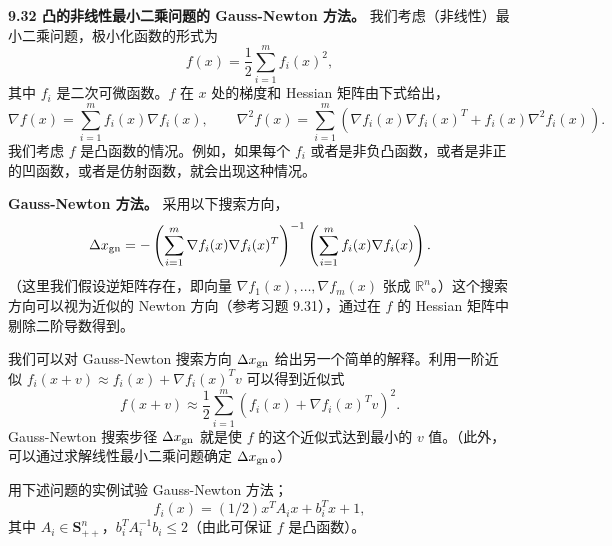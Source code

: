 \documentclass[UTF8, 12pt, fontset=fandol, oneside]{ctexart}
\begin{document}
\noindent\textbf{9.32 凸的非线性最小二乘问题的 Gauss-Newton 方法。}\quad
我们考虑（非线性）最小二乘问题，极小化函数的形式为
\[
f(x)=\frac{1}{2}\sum_{i=1}^m f_i(x)^2,
\]
其中 $f_i$ 是二次可微函数。$f$ 在 $x$ 处的梯度和 Hessian 矩阵由下式给出，
\[
\nabla f(x)=\sum_{i=1}^m f_i(x)\nabla f_i(x),\qquad
\nabla^2 f(x)=\sum_{i=1}^m(\nabla f_i(x)\nabla f_i(x)^T+f_i(x)\nabla^2 f_i(x)).
\]
我们考虑 $f$ 是凸函数的情况。例如，如果每个 $f_i$ 或者是非负凸函数，或者是非正的凹函数，或者是仿射函数，就会出现这种情况。

\noindent\textbf{Gauss-Newton 方法。}\quad
采用以下搜索方向，
\[
\Delta x_{\rm gn}=-\left(\sum_{i=1}^m\nabla f_i(x)\nabla f_i(x)^T\right)^{-1}
\left(\sum_{i=1}^m f_i(x)\nabla f_i(x)\right).
\]
（这里我们假设逆矩阵存在，即向量 $\nabla f_1(x),\ldots,\nabla f_m(x)$ 张成 $\mathbb{R}^n$。）这个搜索方向可以视为近似的 Newton 方向（参考习题 9.31），通过在 $f$ 的 Hessian 矩阵中剔除二阶导数得到。

我们可以对 Gauss-Newton 搜索方向 $\Delta x_{\rm gn}$ 给出另一个简单的解释。利用一阶近似 $f_i(x+v)\approx f_i(x)+\nabla f_i(x)^Tv$ 可以得到近似式
\[
f(x+v)\approx\frac{1}{2}\sum_{i=1}^m(f_i(x)+\nabla f_i(x)^Tv)^2.
\]
Gauss-Newton 搜索步径 $\Delta x_{\rm gn}$ 就是使 $f$ 的这个近似式达到最小的 $v$ 值。（此外，可以通过求解线性最小二乘问题确定 $\Delta x_{\rm gn}$。）

用下述问题的实例试验 Gauss-Newton 方法；
\[
f_i(x)=(1/2)x^TA_ix+b_i^Tx+1,
\]
其中 $A_i\in\mathbf{S}_{++}^n$，$b_i^TA_i^{-1}b_i\leq2$（由此可保证 $f$ 是凸函数）。
\end{document}
